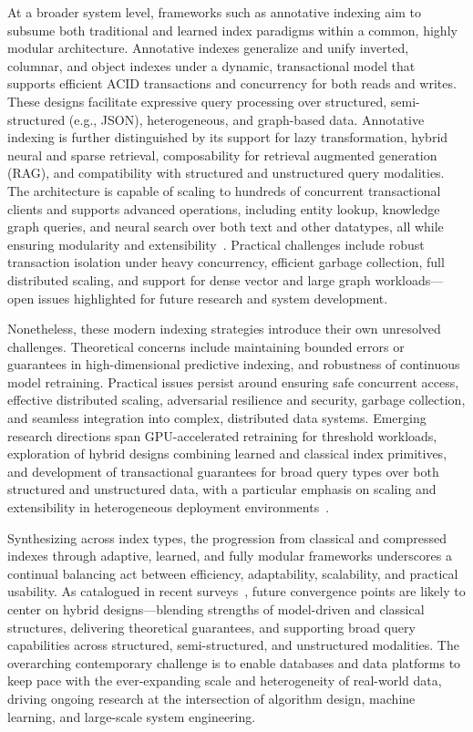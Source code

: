 \documentclass[sigconf]{acmart}
\begin{document}
At a broader system level, frameworks such as annotative indexing aim to subsume both traditional and learned index paradigms within a common, highly modular architecture. Annotative indexes generalize and unify inverted, columnar, and object indexes under a dynamic, transactional model that supports efficient ACID transactions and concurrency for both reads and writes. These designs facilitate expressive query processing over structured, semi-structured (e.g., JSON), heterogeneous, and graph-based data. Annotative indexing is further distinguished by its support for lazy transformation, hybrid neural and sparse retrieval, composability for retrieval augmented generation (RAG), and compatibility with structured and unstructured query modalities. The architecture is capable of scaling to hundreds of concurrent transactional clients and supports advanced operations, including entity lookup, knowledge graph queries, and neural search over both text and other datatypes, all while ensuring modularity and extensibility~\cite{ref112}. Practical challenges include robust transaction isolation under heavy concurrency, efficient garbage collection, full distributed scaling, and support for dense vector and large graph workloads—open issues highlighted for future research and system development.

Nonetheless, these modern indexing strategies introduce their own unresolved challenges. Theoretical concerns include maintaining bounded errors or guarantees in high-dimensional predictive indexing, and robustness of continuous model retraining. Practical issues persist around ensuring safe concurrent access, effective distributed scaling, adversarial resilience and security, garbage collection, and seamless integration into complex, distributed data systems. Emerging research directions span GPU-accelerated retraining for threshold workloads, exploration of hybrid designs combining learned and classical index primitives, and development of transactional guarantees for broad query types over both structured and unstructured data, with a particular emphasis on scaling and extensibility in heterogeneous deployment environments~\cite{ref110,ref111,ref112}.

Synthesizing across index types, the progression from classical and compressed indexes through adaptive, learned, and fully modular frameworks underscores a continual balancing act between efficiency, adaptability, scalability, and practical usability. As catalogued in recent surveys~\cite{ref110}, future convergence points are likely to center on hybrid designs—blending strengths of model-driven and classical structures, delivering theoretical guarantees, and supporting broad query capabilities across structured, semi-structured, and unstructured modalities. The overarching contemporary challenge is to enable databases and data platforms to keep pace with the ever-expanding scale and heterogeneity of real-world data, driving ongoing research at the intersection of algorithm design, machine learning, and large-scale system engineering.
\end{document}
